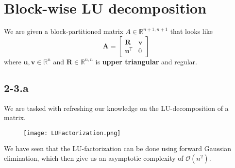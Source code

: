 \documentclass{article}
\begin{document}
\section*{Block-wise LU decomposition}
We are given a block-partitioned matrix $A \in \mathbb{R}^{n+1, n+1}$ that looks like
\begin{equation*}
    \mathbf{A} = 
    \begin{bmatrix}
    \mathbf{R} & \mathbf{v} \\
    \mathbf{u}^{\mathsf{T}} & 0
    \end{bmatrix}
\end{equation*}
where $\mathbf{u}, \mathbf{v}\in \mathbb{R}^{n}$ and $\mathbf{R}\in\mathbb{R}^{n,n}$ is \textbf{upper triangular} and regular.
\subsection*{2-3.a} 
We are tasked with refreshing our knowledge on the LU-decomposition of a matrix. 

\begin{figure}[!hbt]
    \centering
\texttt{[image: LUFactorization.png]}
\end{figure}

\noindent We have seen that the LU-factorization can be done using forward Gaussian elimination, which then give us an asymptotic complexity of $\mathcal{O}\left(n^{2}\right)$.
\end{document}

